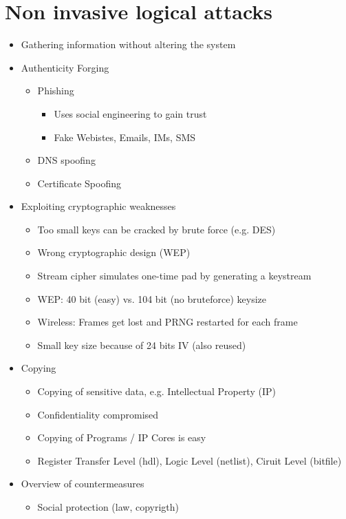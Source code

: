 \documentclass[11pt, paper=a4, twocolumn]{scrartcl}
\begin{document}
	\section{Non invasive logical attacks}
		\begin{itemize}
			\item Gathering information without altering the system
			\item Authenticity Forging
				\begin{itemize}
					\item Phishing
						\begin{itemize}
							\item Uses social engineering to gain trust
							\item Fake Webistes, Emails, IMs, SMS
						\end{itemize}
					\item DNS spoofing
					\item Certificate Spoofing
				\end{itemize}
			\item Exploiting cryptographic weaknesses
				\begin{itemize}
					\item Too small keys can be cracked by brute force (e.g. DES)
					\item Wrong cryptographic design (WEP)
					\item Stream cipher simulates one-time pad by generating a keystream
					\item WEP: 40 bit (easy) vs. 104 bit (no bruteforce) keysize
					\item Wireless: Frames get lost and PRNG restarted for each frame
					\item Small key size because of 24 bits IV (also reused)
				\end{itemize}
			\item Copying
				\begin{itemize}
					\item Copying of sensitive data, e.g. Intellectual Property (IP)
					\item Confidentiality compromised
					\item Copying of Programs / IP Cores is easy
					\item Register Transfer Level (hdl), Logic Level (netlist), Ciruit Level (bitfile)
				\end{itemize}
			\item Overview of countermeasures
				\begin{itemize}
					\item Social protection (law, copyrigth)

\end{itemize}
\end{itemize}
\end{document}
